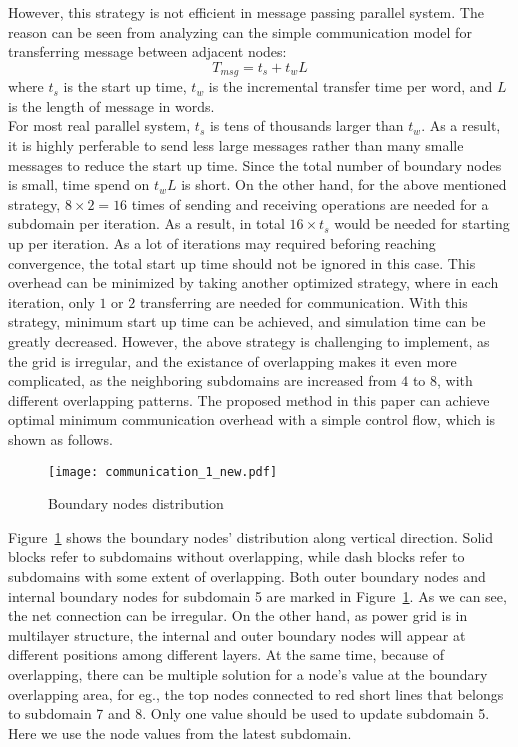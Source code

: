 \documentclass{sig-alternate}
\begin{document}
 	However, this strategy is not efficient in message passing parallel system. The reason can be seen from analyzing can the simple
	communication model for transferring message between adjacent nodes:
	\begin{equation}
		T_{msg} = t_s + t_wL\label{eq_msg}
	\end{equation}
	where $t_s$ is the start up time, $t_w$ is the incremental transfer time per word, and $L$ is the length of message in words.\\
	
	For most real parallel system, $t_s$ is tens of thousands larger than $t_w$. As a result, it is highly perferable to send less 
	large messages rather than many smalle messages to reduce the start up time. Since the total number of boundary nodes is small, 
	time spend on $t_wL$ is short. On the other hand, for the above mentioned strategy, $8\times 2 = 
	16$ times of sending and receiving operations are needed for a subdomain per iteration. As a result, in total $16\times t_s$ 
	would be needed for starting up per iteration. As a lot of iterations may required beforing reaching convergence, the total 
	start up time should not be ignored in this case. This overhead can be minimized by taking another optimized strategy, where
	in each iteration, only $1$ or $2$ transferring are needed for communication. With this strategy, minimum start up time can be 
	achieved, and simulation time can be greatly decreased. However, the above strategy is challenging to implement, as the grid
	is irregular, and the existance of overlapping makes it even more complicated, as the neighboring subdomains are increased from
	$4$ to $8$, with different overlapping patterns. The proposed method in this paper can achieve optimal minimum communication 
	overhead with a simple control flow, which is shown as follows.\\

	\begin{figure}[htbp]
	  \centering
	  \texttt{[image: communication\_1\_new.pdf]}
	  \caption{Boundary nodes distribution}
	  \label{comm}
	\end{figure}

	Figure~\ref{comm} shows the boundary nodes' distribution along vertical direction. Solid blocks refer to subdomains without 
	overlapping, while dash blocks refer to subdomains with some extent of overlapping. Both outer boundary nodes and internal
	boundary nodes for subdomain 5 are marked in Figure~\ref{comm}. As we can see, the net connection can be irregular. On the
	other hand, as power grid is in multilayer structure, the internal and outer boundary nodes will appear at different positions
	among different layers. At the
	same time, because of overlapping, there can be multiple solution for a node's value at the boundary overlapping area, for eg.,
	the top nodes connected to red short lines that belongs to subdomain 7 and 8. Only one value should be used to 
	update subdomain 5. Here we use the node values from the latest subdomain.\\
\end{document}

